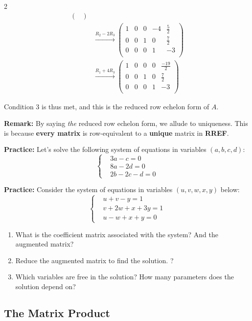 \documentclass[12pt]{article}
\begin{document}
\begin{multicols}{2}
\begin{align*}
\begin{pmatrix}
  \end{pmatrix}\\
  &\xrightarrow{R_2-2R_3} \begin{pmatrix}
      1&0&0&-4&\frac{5}{2}\\ 0&0&1&0&\frac{7}{2}\\ 0&0&0&1&-3\\
\end{pmatrix}\\
&\xrightarrow{R_1+4R_3} \begin{pmatrix}
  1&0&0&0&\frac{-19}{2}\\ 0&0&1&0&\frac{7}{2}\\ 0&0&0&1&-3\\\end{pmatrix}
  \end{align*}

  Condition 3 is thus met, and this is the reduced row echelon form of \(A\).

\textbf{Remark:}
  By saying \emph{the} reduced row echelon form, we allude to uniqueness. This is because \textbf{every matrix} is row-equivalent to a \textbf{unique} matrix in \textbf{RREF}.


  \textbf{Practice:} Let's solve the following system of equations in variables \((a,b,c,d)\):
  \[
  \left\lbrace\begin{aligned}
    &3a-c=0\\
    &8a-2d=0\\
    &2b-2c-d=0
              \end{aligned}\right.
  \]

  \textbf{Practice:} Consider the system of equations in variables \((u,v,w,x,y)\) below:
  \[
  \left\lbrace\begin{aligned}
    &u+v-y=1\\
    &v+2w+x+3y=1\\
    &u-w+x+y=0
              \end{aligned}\right.
  \]
 
  \begin{enumerate}
    \item What is the coefficient matrix associated with the system? And the augmented matrix?
    \item Reduce the augmented matrix to find the solution. ?
    \item Which variables are free in the solution? How many parameters does the solution depend on? 
  \end{enumerate}

\subsection*{The Matrix Product}


\end{multicols}
\end{document}
